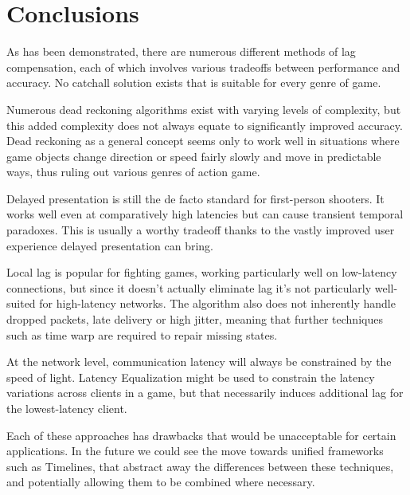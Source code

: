 \documentclass[conference]{IEEEtran}
\begin{document}
	\section{Conclusions}

	As has been demonstrated, there are numerous different methods of lag compensation, each of which involves various tradeoffs between performance and accuracy. No catchall solution exists that is suitable for every genre of game.

	Numerous dead reckoning algorithms exist with varying levels of complexity, but this added complexity does not always equate to significantly improved accuracy. Dead reckoning as a general concept seems only to work well in situations where game objects change direction or speed fairly slowly and move in predictable ways, thus ruling out various genres of action game.

	Delayed presentation is still the de facto standard for first-person shooters. It works well even at comparatively high latencies but can cause transient temporal paradoxes. This is usually a worthy tradeoff thanks to the vastly improved user experience delayed presentation can bring.

	Local lag is popular for fighting games, working particularly well on low-latency connections, but since it doesn't actually eliminate lag it's not particularly well-suited for high-latency networks. The algorithm also does not inherently handle dropped packets, late delivery or high jitter, meaning that further techniques such as time warp are required to repair missing states.

	At the network level, communication latency will always be constrained by the speed of light. Latency Equalization might be used to constrain the latency variations across clients in a game, but that necessarily induces additional lag for the lowest-latency client.

	Each of these approaches has drawbacks that would be unacceptable for certain applications. In the future we could see the move towards unified frameworks such as Timelines, that abstract away the differences between these techniques, and potentially allowing them to be combined where necessary.

	\printbibliography
\end{document}
